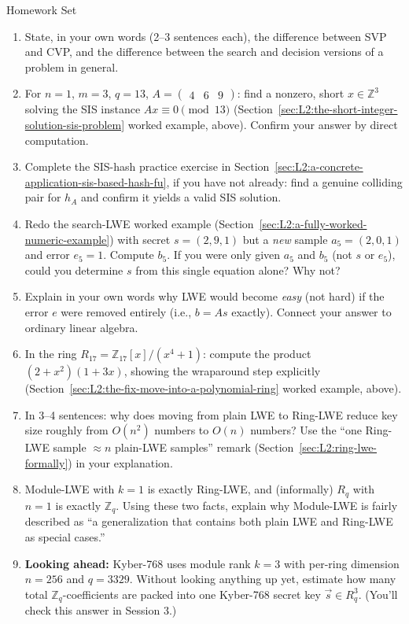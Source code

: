 \begin{exercisebox}{Homework Set}
\begin{enumerate}[leftmargin=*]
  \item State, in your own words (2--3 sentences each), the difference between SVP and CVP, and the difference between the search and decision versions of a problem in general.
  \item For $n=1$, $m=3$, $q=13$, $A = \begin{pmatrix}4 & 6 & 9\end{pmatrix}$: find a nonzero, short $x \in \mathbb{Z}^3$ solving the SIS instance $Ax \equiv 0 \pmod{13}$ (Section~\ref{sec:L2:the-short-integer-solution-sis-problem} worked example, above). Confirm your answer by direct computation.
  \item Complete the SIS-hash practice exercise in Section~\ref{sec:L2:a-concrete-application-sis-based-hash-fu}, if you have not already: find a genuine colliding pair for $h_A$ and confirm it yields a valid SIS solution.
  \item Redo the search-LWE worked example (Section~\ref{sec:L2:a-fully-worked-numeric-example}) with secret $s=(2,9,1)$ but a \emph{new} sample $a_5 = (2,0,1)$ and error $e_5=1$. Compute $b_5$. If you were only given $a_5$ and $b_5$ (not $s$ or $e_5$), could you determine $s$ from this single equation alone? Why not?
  \item Explain in your own words why LWE would become \emph{easy} (not hard) if the error $e$ were removed entirely (i.e., $b = As$ exactly). Connect your answer to ordinary linear algebra.
  \item In the ring $R_{17} = \mathbb{Z}_{17}[x]/(x^4+1)$: compute the product $(2 + x^2)(1 + 3x)$, showing the wraparound step explicitly (Section~\ref{sec:L2:the-fix-move-into-a-polynomial-ring} worked example, above).
  \item In 3--4 sentences: why does moving from plain LWE to Ring-LWE reduce key size roughly from $O(n^2)$ numbers to $O(n)$ numbers? Use the ``one Ring-LWE sample $\approx n$ plain-LWE samples'' remark (Section~\ref{sec:L2:ring-lwe-formally}) in your explanation.
  \item Module-LWE with $k=1$ is exactly Ring-LWE, and (informally) $R_q$ with $n=1$ is exactly $\mathbb{Z}_q$. Using these two facts, explain why Module-LWE is fairly described as ``a generalization that contains both plain LWE and Ring-LWE as special cases.''
  \item \textbf{Looking ahead:} Kyber-768 uses module rank $k=3$ with per-ring dimension $n=256$ and $q=3329$. Without looking anything up yet, estimate how many total $\mathbb{Z}_q$-coefficients are packed into one Kyber-768 secret key $\vec s \in R_q^3$. (You'll check this answer in Session 3.)
\end{enumerate}
\end{exercisebox}
